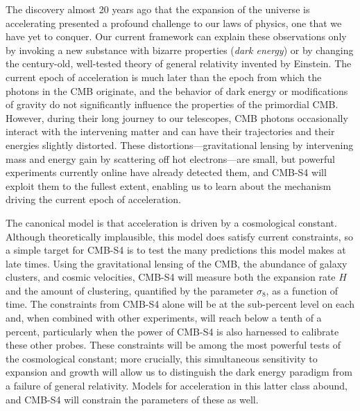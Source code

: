 The discovery almost 20 years ago that the expansion of the universe is accelerating presented a profound challenge to our laws of physics, one that we have yet to conquer. Our current framework can explain these observations only by invoking a new substance with bizarre properties ({\it dark energy}) or by changing the century-old, well-tested theory of general relativity invented by Einstein. The current epoch of acceleration is much later than the epoch from which the photons in the CMB originate, and the behavior of dark energy or modifications of gravity do not significantly influence the properties of the primordial CMB. However, during their long journey to our telescopes, CMB photons occasionally interact with the intervening matter and can have their trajectories and their energies slightly distorted. These distortions---gravitational lensing by intervening mass and energy gain by scattering off hot electrons---are small, but powerful experiments currently online have already detected them, and CMB-S4 will exploit them to the fullest extent, enabling us to learn about the mechanism driving the current epoch of acceleration.

The canonical model is that acceleration is driven by a cosmological constant. Although theoretically implausible, this model does satisfy current constraints, so a simple target for CMB-S4 is to test the many predictions this model makes at late times. Using the gravitational lensing of the CMB, the abundance of galaxy clusters, and cosmic velocities, CMB-S4 will measure both the expansion rate $H$ and the amount of clustering, quantified by the parameter $\sigma_8$, as a function of time. The constraints from CMB-S4 alone will be at the sub-percent level on each and, when combined with other experiments, will reach below a tenth of a percent, particularly when the power of CMB-S4 is also harnessed to calibrate these other probes. These constraints will be among the most powerful tests of the cosmological constant; more crucially, this simultaneous sensitivity to expansion and growth will allow us to distinguish the dark energy paradigm from a failure of general relativity. Models for acceleration in this latter class abound, and CMB-S4 will constrain the parameters of these as well. 
